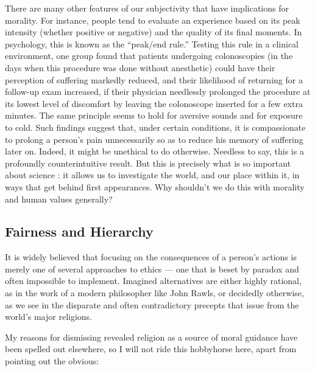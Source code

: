 \documentclass[a4paper,14pt]{extarticle}
\begin{document}
There are many other features of our subjectivity that have implications for morality.
For instance, people tend to evaluate an experience based on its peak intensity (whether positive or negative) and the quality of its final moments.
In psychology, this is known as the ``peak/end rule.''
Testing this rule in a clinical environment, one group found that patients undergoing colonoscopies (in the days when this procedure was done without anesthetic) could have their perception of suffering markedly reduced, and their likelihood of returning for a follow-up exam increased, if their physician needlessly prolonged the procedure at its lowest level of discomfort by leaving the colonoscope inserted for a few extra minutes.
The same principle seems to hold for aversive sounds and for exposure to cold.
Such findings suggest that, under certain conditions, it is compassionate to prolong a person's pain unnecessarily so as to reduce his memory of suffering later on.
Indeed, it might be unethical to do otherwise.
Needless to say, this is a profoundly counterintuitive result.
But this is precisely what is so important about science :
it allows us to investigate the world, and our place within it, in ways that get behind first appearances.
Why shouldn't we do this with morality and human values generally?


\subsection{Fairness and Hierarchy}

It is widely believed that focusing on the consequences of a person's actions is merely one of several approaches to ethics --- one that is beset by paradox and often impossible to implement.
Imagined alternatives are either highly rational, as in the work of a modern philosopher like John Rawls, or decidedly otherwise, as we see in the disparate and often contradictory precepts that issue from the world's major religions.

My reasons for dismissing revealed religion as a source of moral guidance have been spelled out elsewhere, so I will not ride this hobbyhorse here, apart from pointing out the obvious:
\end{document}
